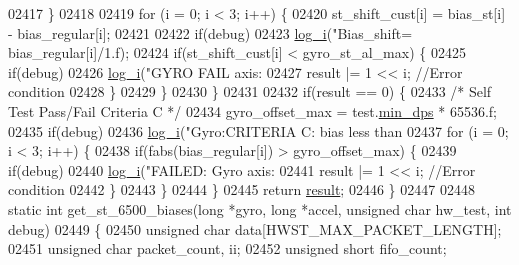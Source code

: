 \begin{DoxyCode}
{{{{{{{{{{{{{{{{{{{{{{{{02417         \}
02418 
02419         \textcolor{keywordflow}{for} (i = 0; i < 3; i++) \{
02420             st\_shift\_cust[i] = bias\_st[i] - bias\_regular[i];
02421 
02422             \textcolor{keywordflow}{if}(debug)
02423                 \hyperlink{inv__mpu_8c_a67fc07fa528d8e62dc7b88a847b563f5}{log\_i}(\textcolor{stringliteral}{"Bias\_shift=%
       bias\_regular[i]/1.f);
02424             \textcolor{keywordflow}{if}(st\_shift\_cust[i] < gyro\_st\_al\_max) \{
02425                 \textcolor{keywordflow}{if}(debug)
02426                     \hyperlink{inv__mpu_8c_a67fc07fa528d8e62dc7b88a847b563f5}{log\_i}(\textcolor{stringliteral}{"GYRO FAIL axis:%
02427                 result |= 1 << i;   \textcolor{comment}{//Error condition}
02428             \}
02429         \}
02430     \}
02431 
02432     \textcolor{keywordflow}{if}(result == 0) \{
02433     \textcolor{comment}{/* Self Test Pass/Fail Criteria C */}
02434         gyro\_offset\_max = test.\hyperlink{structtest__s_a73ee82e1de6d3bdc4cc37282c012f0e1}{min\_dps} * 65536.f;
02435         \textcolor{keywordflow}{if}(debug)
02436             \hyperlink{inv__mpu_8c_a67fc07fa528d8e62dc7b88a847b563f5}{log\_i}(\textcolor{stringliteral}{"Gyro:CRITERIA C: bias less than %
02437         \textcolor{keywordflow}{for} (i = 0; i < 3; i++) \{
02438             \textcolor{keywordflow}{if}(fabs(bias\_regular[i]) > gyro\_offset\_max) \{
02439                 \textcolor{keywordflow}{if}(debug)
02440                     \hyperlink{inv__mpu_8c_a67fc07fa528d8e62dc7b88a847b563f5}{log\_i}(\textcolor{stringliteral}{"FAILED: Gyro axis:%
02441                 result |= 1 << i;   \textcolor{comment}{//Error condition}
02442             \}
02443         \}
02444     \}
02445     \textcolor{keywordflow}{return} \hyperlink{sensor_8h_a4c9d9cb8bb9d2b707a152051408f40e5}{result};
02446 \}
02447 
02448 \textcolor{keyword}{static} \textcolor{keywordtype}{int} get\_st\_6500\_biases(\textcolor{keywordtype}{long} *gyro, \textcolor{keywordtype}{long} *accel, \textcolor{keywordtype}{unsigned} \textcolor{keywordtype}{char} hw\_test, \textcolor{keywordtype}{int} debug)
02449 \{
02450     \textcolor{keywordtype}{unsigned} \textcolor{keywordtype}{char} data[HWST\_MAX\_PACKET\_LENGTH];
02451     \textcolor{keywordtype}{unsigned} \textcolor{keywordtype}{char} packet\_count, ii;
02452     \textcolor{keywordtype}{unsigned} \textcolor{keywordtype}{short} fifo\_count;
}}}}}}}}}}}}}}}}}}}}}}}}}}}}
\end{DoxyCode}

